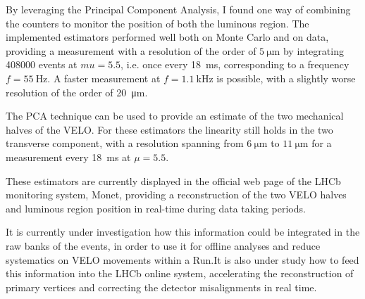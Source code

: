 By leveraging the Principal Component Analysis, I found one way of combining the counters to monitor the position of both the luminous region. The implemented estimators performed well both on Monte Carlo and on data, providing a measurement with a resolution of the order of $\SI{5}{\micro\meter}$ by integrating 408000 events at $mu=5.5$, i.e. once every \SI{18}{\milli\second}, corresponding to a frequency $f=\SI{55}{\hertz}$. A faster measurement at $f=\SI{1.1}{\kilo\hertz}$ is possible, with a slightly worse resolution of the order of \SI{20}{\micro\meter}.  

The PCA technique can be used to provide an estimate of the two mechanical halves of the VELO. For these estimators the linearity still holds in the two transverse component, with a resolution spanning from $\SI{6}{\micro\meter}$ to $\SI{11}{\micro\meter}$ for a measurement every \SI{18}{\milli\second} at $\mu=5.5$.

These estimators are currently displayed in the official web page of the LHCb monitoring system, Monet, providing a reconstruction of the two VELO halves and luminous region position in real-time during data taking periods.

It is currently under investigation how this information could be integrated in the raw banks of the events, in order to use it for offline analyses and reduce systematics on VELO movements within a Run.It is also under study how to feed this information into the LHCb online system, accelerating the reconstruction of primary vertices and correcting the detector misalignments in real time.

